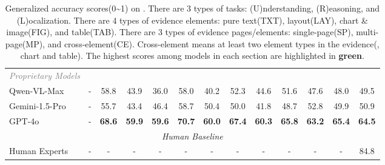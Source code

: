 \begin{table}[htbp]
{\begin{tabular}{lc|ccc|cccc|ccc|c}
        \textcolor{gray}{\textit{Proprietary Models}} \\
        Qwen-VL-Max & - & 58.8 & 43.9 & 36.0 & 58.0 & 40.2 & 52.3 & 44.6 & 51.6 & 47.6 & 48.0 & 49.5 \\
        Gemini-1.5-Pro & - & 55.7 & 43.4 & 46.4 & 58.7 & 50.4 & 50.0 & 41.8 & 48.7 & 52.8 & 49.9 & 50.9 \\
        GPT-4o & - & \colorbox{firstBest}{\textbf{68.6}} & \colorbox{firstBest}{\textbf{59.9}} & \colorbox{firstBest}{\textbf{59.6}} & \colorbox{firstBest}{\textbf{70.7}} & \colorbox{firstBest}{\textbf{60.0}} & \colorbox{firstBest}{\textbf{67.4}} & \colorbox{firstBest}{\textbf{60.3}} & \colorbox{firstBest}{\textbf{65.8}} & \colorbox{firstBest}{\textbf{63.2}} & \colorbox{firstBest}{\textbf{65.4}} & \colorbox{firstBest}{\textbf{64.5}} \\

        \midrule
        \multicolumn{13}{c}{\textit{Human Baseline} } \\
        \midrule
        Human Experts & - & - & - & - & - & - & - & - & - & - & - & 84.8 \\
        
        \bottomrule
    \end{tabular}
    }
    \caption{Generalized accuracy scores(0\textasciitilde1) on \benchName. There are 3 types of tasks: (U)nderstanding, (R)easoning, and (L)ocalization. There are 4 types of evidence elements: pure text(TXT), layout(LAY), chart \& image(FIG), and table(TAB). There are 3 types of evidence pages/elements: single-page(SP), multi-page(MP), and cross-element(CE). Cross-element means at least two element types in the evidence(\eg, chart and table). The highest scores among models in each section are highlighted in \colorbox{firstBest}{\textbf{green}}.}
    \label{tab:main_results_2}
    \vspace{-5mm}
\end{table}
